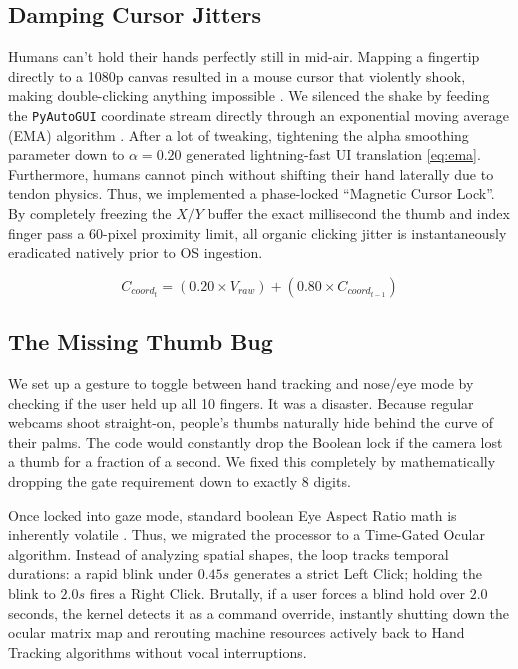 \documentclass[conference]{IEEEtran}
\begin{document}
\subsection{Damping Cursor Jitters}
Humans can't hold their hands perfectly still in mid-air. Mapping a fingertip directly to a 1080p canvas resulted in a mouse cursor that violently shook, making double-clicking anything impossible \cite{b22}. We silenced the shake by feeding the \texttt{PyAutoGUI} coordinate stream directly through an exponential moving average (EMA) algorithm \cite{b2}. After a lot of tweaking, tightening the alpha smoothing parameter down to $\alpha = 0.20$ generated lightning-fast UI translation \eqref{eq:ema}. Furthermore, humans cannot pinch without shifting their hand laterally due to tendon physics. Thus, we implemented a phase-locked ``Magnetic Cursor Lock''. By completely freezing the $X/Y$ buffer the exact millisecond the thumb and index finger pass a 60-pixel proximity limit, all organic clicking jitter is instantaneously eradicated natively prior to OS ingestion.

\begin{equation}
C_{coord_t} = (0.20 \times V_{raw}) + (0.80 \times C_{coord_{t-1}})
\label{eq:ema}
\end{equation}

\subsection{The Missing Thumb Bug}
We set up a gesture to toggle between hand tracking and nose/eye mode by checking if the user held up all 10 fingers. It was a disaster. Because regular webcams shoot straight-on, people's thumbs naturally hide behind the curve of their palms. The code would constantly drop the Boolean lock if the camera lost a thumb for a fraction of a second. We fixed this completely by mathematically dropping the gate requirement down to exactly 8 digits.

Once locked into gaze mode, standard boolean Eye Aspect Ratio math is inherently volatile \cite{b11}. Thus, we migrated the processor to a Time-Gated Ocular algorithm. Instead of analyzing spatial shapes, the loop tracks temporal durations: a rapid blink under $0.45s$ generates a strict Left Click; holding the blink to $2.0s$ fires a Right Click. Brutally, if a user forces a blind hold over $2.0$ seconds, the kernel detects it as a command override, instantly shutting down the ocular matrix map and rerouting machine resources actively back to Hand Tracking algorithms without vocal interruptions.
\end{document}
